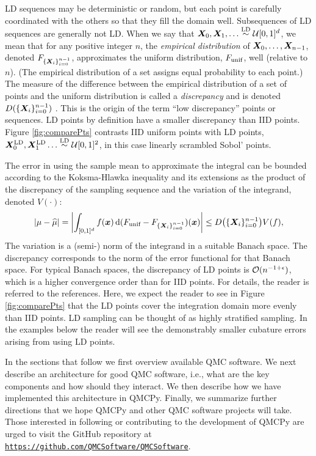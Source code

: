 \documentclass[graybox,footinfo]{svmult}
\newcommand{\QMCPYabs}[1]{\ensuremath{{\left \lvert #1 \right \rvert}}}
\newcommand{\QMCPYbiggabs}[1]{\ensuremath{{\biggl \lvert #1 \biggr \rvert}}}
\newcommand{\hmu}{\widehat{\mu}}
\newcommand{\LD}{\textup{LD}}
\newcommand{\unif}{\textup{unif}}
\newcommand{\LDsim}{\overset{\LD}{\sim}}
\newcommand{\cube}{[0,1]^d}
\begin{document}
LD sequences may be deterministic or random, but each point is carefully coordinated with the others so that they fill the domain well.  Subsequences of LD sequences are generally not LD.  When we say that $\bsX_0, \bsX_1, \ldots \LDsim \calU\cube$, we mean that for any positive integer $n$,  the \emph{empirical distribution} of ${\boldsymbol{X}}_0, \ldots, {\boldsymbol{X}}_{n-1}$, denoted $F_{\{{\boldsymbol{X}}_i\}_{i=0}^{n-1}}$,  approximates the uniform distribution, $F_\unif$, well (relative to $n$).  (The empirical distribution of a set assigns equal probability to each point.)  The measure of the difference between the empirical distribution of a set of points and the uniform distribution is called a \emph{discrepancy} and is denoted $D(\{{\boldsymbol{X}}_i\}_{i=0}^{n-1})$ \cite{DicEtal14a,Hic97a,Hic99a,Nie92}.  This is the origin of the term ``low discrepancy'' points or sequences.  LD points by definition have a smaller discrepancy than IID points.  Figure \ref{fig:comparePts} contrasts IID uniform points with LD points, $\bsX^{\LD}_0, \bsX^{\LD}_1 \ldots \LDsim \calU[0,1]^2$, in this case linearly scrambled Sobol' points.

The error in using the sample mean to approximate the integral can be bounded according to the Koksma-Hlawka inequality and its extensions \cite{DicEtal14a,Hic97a,Hic99a,Nie92} as the product of the discrepancy of the sampling sequence and the variation of the integrand, denoted $V(\cdot)$:
\begin{equation}
	\QMCPYabs{\mu - \hmu} = \QMCPYbiggabs{\int_{\cube} f(\bsx) \, \D (F_\unif - F_{\{\bsX_i\}_{i=0}^{n-1}}) (\bsx)} \le D\bigl(\{\bsX_i\}_{i=0}^{n-1}\bigr) V(f),
\end{equation} 
The variation is a (semi-) norm of the integrand in a suitable Banach space.  The discrepancy corresponds to the norm of the error functional for that Banach space.  For typical Banach spaces, the discrepancy of LD points is ${\mathcal{O}}(n^{-1+\epsilon})$, which is a higher convergence order than for IID points.  For details, the reader is referred to the references.  Here, we expect the reader to see in Figure \ref{fig:comparePts} that the LD points cover the integration domain more evenly than IID points.  LD sampling can be thought of as highly stratified sampling.  In the examples below the reader will see the demonstrably smaller cubature errors arising from using LD points.

In the sections that follow we first overview available QMC software.  We next describe an architecture for good QMC software, i.e., what are the key components and how should they interact.  We then describe how we have implemented this architecture in QMCPy.  Finally, we summarize further directions that we hope QMCPy and other QMC software projects will take.  Those interested in following or contributing to the development of QMCPy are urged to visit the GitHub repository at \href{https://github.com/QMCSoftware/QMCSoftware}{\nolinkurl{https://github.com/QMCSoftware/QMCSoftware}}.
\end{document}
